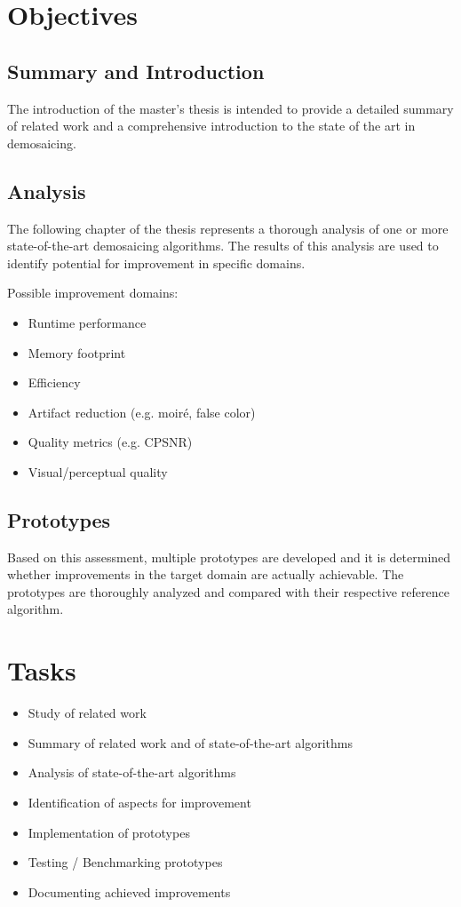 \documentclass[english,notitlepage,smartquotes]{hgbreport}
\begin{document}
\section{Objectives} %

\subsection{Summary and Introduction}

The introduction of the master's thesis is intended to provide a detailed summary of related work and a comprehensive introduction to the state of the art in demosaicing.

\subsection{Analysis}

The following chapter of the thesis represents a thorough analysis of one or more state-of-the-art demosaicing algorithms. The results of this analysis are used to identify potential for improvement in specific domains.

\noindent
Possible improvement domains:

\begin{itemize}
	\item Runtime performance
	\item Memory footprint
	\item Efficiency
	\item Artifact reduction (e.g. moiré, false color)
	\item Quality metrics (e.g. CPSNR)
	\item Visual/perceptual quality
\end{itemize}

\subsection{Prototypes}

Based on this assessment, multiple prototypes are developed and it is determined whether improvements in the target domain are actually achievable. The prototypes are thoroughly analyzed and compared with their respective reference algorithm.

\section{Tasks}

\begin{itemize}
	\item Study of related work
	\item Summary of related work and of state-of-the-art algorithms
	\item Analysis of state-of-the-art algorithms
	\item Identification of aspects for improvement
	\item Implementation of prototypes
	\item Testing / Benchmarking prototypes
	\item Documenting achieved improvements
\end{itemize}
\end{document}
